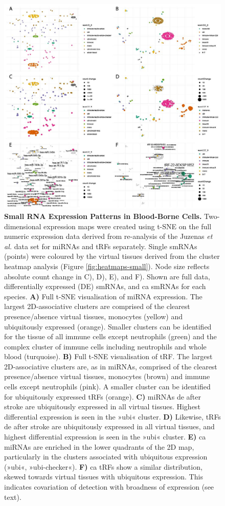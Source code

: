 \begin{figure}
\includegraphics[width=\textwidth]{figures/tsne-small}
\caption[Small RNA Expression Patterns in Blood-Borne Cells.]{\textbf{Small RNA Expression Patterns in Blood-Borne Cells.} Two-dimensional expression maps were created using t-SNE on the full numeric expression data derived from re-analysis of the Juzenas \emph{et al.}\cite{Juzenas2017} data set for miRNAs and tRFs separately. Single smRNAs (points) were coloured by the virtual tissues derived from the cluster heatmap analysis (Figure \ref{fig:heatmaps-small}). Node size reflects absolute count change in C), D), E), and F). Shown are full data, differentially expressed (DE) smRNAs, and \acf{ca} smRNAs for each species. \textbf{A)} Full t-SNE visualisation of miRNA expression. The largest 2D-associative clusters are comprised of the clearest presence/absence virtual tissues, monocytes (yellow) and ubiquitously expressed (orange). Smaller clusters can be identified for the tissue of all immune cells except neutrophils (green) and the complex cluster of immune cells including neutrophils and whole blood (turquoise). \textbf{B)} Full t-SNE visualisation of tRF. The largest 2D-associative clusters are, as in miRNAs, comprised of the clearest presence/absence virtual tissues, monocytes (brown) and immune cells except neutrophils (pink). A smaller cluster can be identified for ubiquitously expressed tRFs (orange). \textbf{C)} miRNAs \ac{de} after stroke are ubiquitously expressed in all virtual tissues. Highest differential expression is seen in the »ubi« cluster. \textbf{D)} Likewise, tRFs \ac{de} after stroke are ubiquitously expressed in all virtual tissues, and highest differential expression is seen in the »ubi« cluster. \textbf{E)} \Ac{ca} miRNAs are enriched in the lower quadrants of the 2D map, particularly in the clusters associated with ubiquitous expression (»ubi«, »ubi-checker«). \textbf{F)} \Ac{ca} tRFs show a similar distribution, skewed towards virtual tissues with ubiquitous expression. This indicates covariation of detection with broadness of expression (see text).
\label{fig:tsne-small}}
\end{figure}

